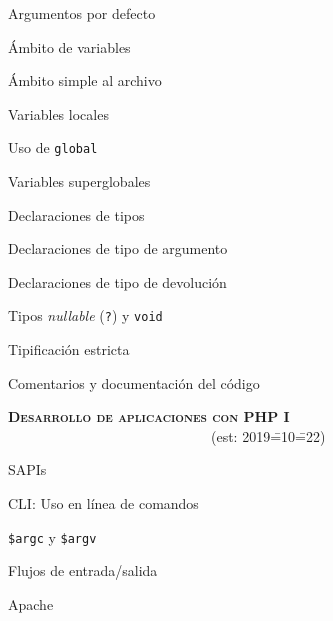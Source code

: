 \begin{longenum}
\begin{longenum}
\begin{longenum}
\begin{longenum}
                \item Argumentos por defecto
            \end{longenum}
            \item Ámbito de variables
            \begin{longenum}
                \item Ámbito simple al archivo
                \item Variables locales
                \item Uso de \texttt{global}
                \item Variables superglobales
            \end{longenum}
            \item Declaraciones de tipos
            \begin{longenum}
                \item Declaraciones de tipo de argumento
                \item Declaraciones de tipo de devolución
                \item Tipos \textit{nullable} (\texttt{?}) y \texttt{void}
                \item Tipificación estricta
            \end{longenum}
        \end{longenum}
        \item Comentarios y documentación del código
    \end{longenum}
    \item \textbf{\textsc{Desarrollo de aplicaciones con PHP I}} \ \ \ \ \ \ \ \ \ \ \ \ \ \ \ \ \ \ \ \ \ \ \ \ \ \ \ \ \ (est: 2019\==10\==22)
    \begin{longenum}
        \item SAPIs
        \begin{longenum}
            \item CLI: Uso en línea de comandos
            \begin{longenum}
                \item \texttt{\$argc} y \texttt{\$argv}
                \item Flujos de entrada/salida
            \end{longenum}
            \item Apache
            \begin{longenum}

\end{longenum}
\end{longenum}
\end{longenum}
\end{longenum}

